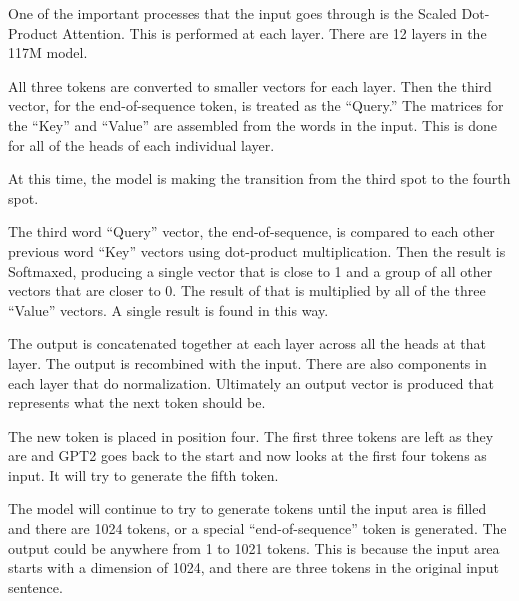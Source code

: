 One of the important processes that the input goes through is the Scaled Dot-Product Attention. This is performed at each layer. There are 12 layers in the 117M model.

All three tokens are converted to smaller vectors for each layer. Then the third vector, for the end-of-sequence token, is treated as the ``Query.'' The matrices for the ``Key'' and ``Value'' are assembled from the words in the input. This is done for all of the heads of each individual layer.

At this time, the model is making the transition from the third spot to the fourth spot.

The third word ``Query'' vector, the end-of-sequence, is compared to each other previous word ``Key'' vectors using dot-product multiplication. Then the result is Softmaxed, producing a single vector that is close to 1 and a group of all other vectors that are closer to 0. The result of that is multiplied by all of the three ``Value'' vectors. A single result is found in this way.

The output is concatenated together at each layer across all the heads at that layer. The output is recombined with the input. There are also components in each layer that do normalization. Ultimately an output vector is produced that represents what the next token should be. %


The new token is placed in position four. The first three tokens are left as they are and GPT2 goes back to the start and now looks at the first four tokens as input. It will try to generate the fifth token.

The model will continue to try to generate tokens until the input area is filled and there are 1024 tokens, or a special ``end-of-sequence'' token is generated. The output could be anywhere from 1 to 1021 tokens. This is because the input area starts with a dimension of 1024, and there are three tokens in the original input sentence.


